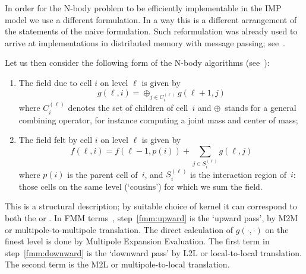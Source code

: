 
In order for the N-body problem to be efficiently implementable in
the \ac{IMP} model we use a different formulation. In a way this 
is a different arrangement of the statements of the naive formulation.
Such reformulation was already used to arrive at implementations
in distributed memory with message
passing; see~\cite{Salmon86fastparallel}. 

Let us then consider the following form of the N-body algorithms
(see~\cite{Katzenelson:nbody,Agullo:pipeFMMinria}):
\begin{enumerate}
\item\label{fmm:upward} The field due to cell $i$ on level $\ell$ is given by
\begin{equation}
 g(\ell,i) = \oplus_{j\in C^{(\ell)}_i} g(\ell+1,j) 
 \label{eq:BH-g}
\end{equation}
  where $C^{(\ell)}_i$ denotes the set of children of cell~$i$ and
  $\oplus$~stands for a general
  combining operator, for instance computing a joint mass and
  center of mass;
\item\label{fmm:downward} The field felt by cell $i$ on level $\ell$ is given by
\begin{equation}
 f(\ell,i) = f(\ell-1,p(i))+\sum_{j\in S^{(\ell)}_i}g(\ell,j) 
\label{eq:BH-f}
\end{equation}
  where $p(i)$ is the parent cell of~$i$, and $S^{(\ell)}_i$ is the
  interaction region of~$i$: those cells on the same level (`cousins')
  for which we sum the field.
\end{enumerate}

This is a structural description; by suitable choice of kernel it can
correspond to both the  or .
%
In \ac{FMM} terms~\cite{Kurzak:FMM}, step~\ref{fmm:upward} is the
`upward pass', by M2M or multipole-to-multipole translation. The
direct calculation of $g(\cdot,\cdot)$ on the finest level is done by
Multipole Expansion Evaluation.
%
The first term in step~\ref{fmm:downward} is the `downward pass' by
L2L or local-to-local translation. The second term is the M2L or
multipole-to-local translation.
